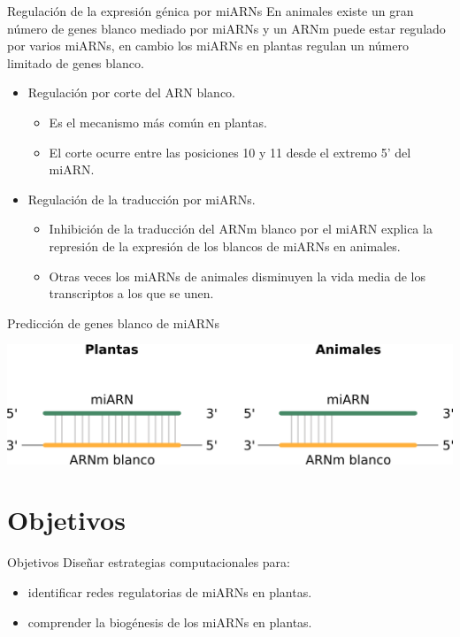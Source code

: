 \documentclass{beamer}
\begin{document}
\begin{frame}{Regulación de la expresión génica por miARNs}
En animales existe un gran número de genes blanco mediado por miARNs y un ARNm puede estar regulado por varios miARNs, en cambio los miARNs en plantas regulan un número limitado de genes blanco.
    \begin{itemize}
        \item<2-> Regulación por corte del ARN blanco.
        \begin{itemize}
            \item Es el mecanismo más común en plantas.
            \item El corte ocurre entre las posiciones 10 y 11 desde el extremo 5’ del miARN.
        \end{itemize}
        \item<3-> Regulación de la traducción por miARNs.
        \begin{itemize}
            \item Inhibición de la traducción del ARNm blanco por el miARN explica la represión de la expresión de los blancos de miARNs en animales.
            \item Otras veces los miARNs de animales disminuyen la vida media de los transcriptos a los que se unen.
        \end{itemize}

    \end{itemize}
\end{frame}

\begin{frame}{Predicción de genes blanco de miARNs}
	\begin{center}
		\includegraphics[width=1\textwidth]{img/interaccion_miRNA_target.png}
	\end{center}
\end{frame}


\section{Objetivos}

\begin{frame}{Objetivos}
    Diseñar estrategias computacionales para:
	\begin{itemize}[<+->]
        \item identificar redes regulatorias de miARNs en plantas.
        \item comprender la biogénesis de los miARNs en plantas.
	\end{itemize}
\end{frame}
\end{document}
